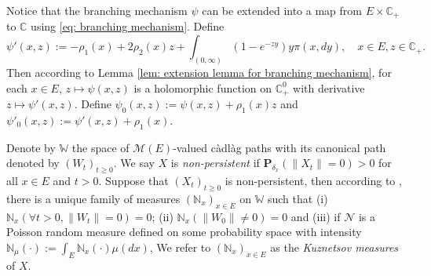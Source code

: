 \documentclass[12pt,a4paper]{amsart}
\theoremstyle{plain}
\theoremstyle{definition}
\numberwithin{equation}{section}
\begin{document}
    Notice that the branching mechanism $\psi$ can be extended into a map from $E \times \mathbb C_+$ to $\mathbb C$ using \eqref{eq: branching mechanism}.
    Define
\begin{equation}
    \psi'(x,z):= - \rho_1(x) + 2\rho_2(x) z + \int_{(0,\infty)} (1-e^{-zy})y\pi(x,dy),
    \quad x\in E, z\in \mathbb C_+.
\end{equation}
    Then according to Lemma \ref{lem: extension lemma for branching mechanism}, for each $x \in E$, $z \mapsto \psi(x,z)$ is a holomorphic function on $\mathbb C_+^0$ with derivative $z \mapsto \psi'(x,z)$.
    Define $\psi_0(x,z) := \psi(x,z)+ \rho_1(x)z $ and $\psi'_0(x,z) := \psi'(x,z) + \rho_1(x)$.

    Denote by $\mathbb W$ the space of $\mathcal M(E)$-valued c\`{a}dl\`{a}g paths with its canonical path denoted by $(W_t)_{t\geq 0}$.
    We say $X$ is \emph{non-persistent} if $\mathbf P_{\delta_x}(\|X_t\|= 0) > 0$ for all $x\in E$ and $t> 0$.
    Suppose that $(X_t)_{t\geq 0}$ is non-persistent, then according to \cite[Section 8.4]{Li2011Measure-valued},
    there is a unique family of measures $(\mathbb N_x)_{x\in E}$ on $\mathbb W$ such that
(i) $\mathbb N_x (\forall t > 0, \|W_t\|=0) =0$; (ii) $\mathbb N_x(\|W_0 \|\neq 0) = 0$
and (iii) if $\mathcal N$ is a Poisson random measure defined on some probability space with intensity $\mathbb N_\mu(\cdot):= \int_E \mathbb N_x(\cdot )\mu(dx)$,
    We refer to $(\mathbb N_x)_{x\in E}$ as the \emph{Kuznetsov measures} of $X$.
\end{document}
